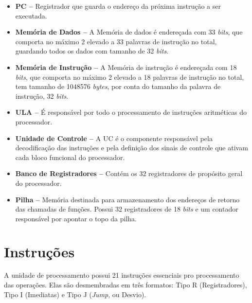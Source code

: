 \documentclass{report}
\begin{document}
  \begin{itemize}
    \item \textbf{PC --} Registrador que guarda o endereço da próxima instrução a ser executada.

    \item \textbf{Memória de Dados --} A Memória de dados é endereçada com 33 \textit{bits}, que comporta no máximo 2 elevado a 33 palavras de instrução no total, guardando todos os dados com tamanho de 32 \textit{bits}.
   
    \item \textbf{Memória de Instrução --} A Memória de instrução é endereçada com 18 \textit{bits}, que comporta no máximo 2 elevado a 18 palavras de instrução no total, tem tamanho de 1048576 \textit{bytes}, por conta do tamanho da palavra de instrução, 32 \textit{bits}.
    
    \item \textbf{ULA --} É responsável por todo o processamento de instruções aritméticas do processador.
    
    \item \textbf{Unidade de Controle --} A UC é o componente responsável pela decodificação das instruções e pela definição dos sinais de controle que ativam cada bloco funcional do processador.
    
    \item \textbf{Banco de Registradores --} Contém os 32 registradores de propósito geral do processador.
    
    \item \textbf{Pilha --} Memória destinada para armazenamento dos endereços de retorno das chamadas de funções. Possui 32 registradores de 18 \textit{bits} e um contador responsável por apontar o topo da pilha.
  \end{itemize}
  \newpage
  
  \section{Instruções}
  
  A unidade de processamento possui 21 instruções essenciais pro processamento das operações. Elas são desmembradas em três formatos: Tipo R (Registradores), Tipo I (Imediatas) e Tipo J (\textit{Jump}, ou Desvio).
  
\end{document}
